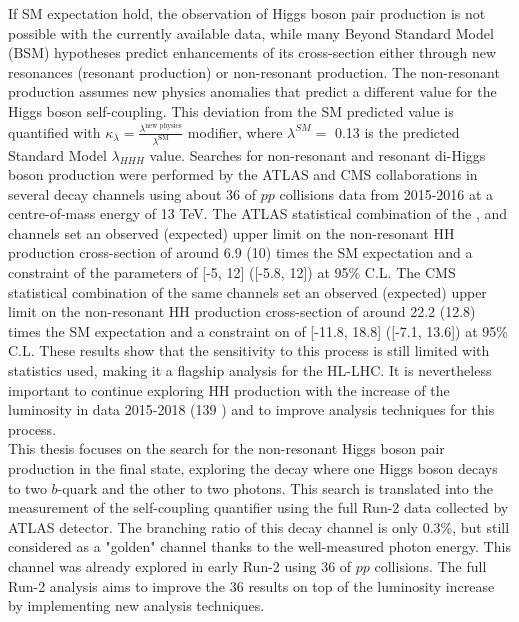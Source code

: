 If SM expectation hold, the observation of Higgs boson pair production is not possible with the currently available data, while many Beyond Standard Model (BSM) hypotheses predict enhancements of its cross-section either through new resonances (resonant production) or non-resonant production. The non-resonant production assumes new physics anomalies that predict a different value for the Higgs boson self-coupling. This deviation from the SM predicted value is quantified with $\kappa_{\lambda} = \frac{\lambda^{\text{new physics}}}{\lambda^{\text{SM}}}$ modifier, where $\lambda^{SM} = $ 0.13 is the predicted Standard Model $\lambda_{HHH}$ value. Searches for non-resonant and resonant di-Higgs boson production were performed by the ATLAS and CMS collaborations in several decay channels using about 36 \ifb of $pp$ collisions data from 2015-2016 at a centre-of-mass energy of 13 TeV. The ATLAS statistical combination of the \bbbb, \bbtt and \bbyy channels set an observed (expected) upper limit on the non-resonant HH production cross-section of around 6.9 (10) times the SM expectation and a constraint of the \kl parameters of [-5, 12] ([-5.8, 12]) at 95\% C.L. The CMS statistical combination of the same channels set an observed (expected) upper limit on the non-resonant HH production cross-section of around 22.2 (12.8) times the SM expectation and a constraint on \kl of [-11.8, 18.8] ([-7.1, 13.6]) at 95\% C.L. These results show that the sensitivity to this process is still limited with statistics used, making it a flagship analysis for the HL-LHC. It is nevertheless important to continue exploring HH production with the increase of the luminosity in data 2015-2018 (139 \ifb) and to improve analysis techniques for this process. \\
This thesis focuses on the search for the non-resonant Higgs boson pair production in the \bbyy final state, exploring the decay where one Higgs boson decays to two $b$-quark and the other to two photons. This search is translated into the measurement of the self-coupling quantifier \kl using the full Run-2 data collected by ATLAS detector. The branching ratio of this decay channel is only 0.3\%, but still considered as a "golden" channel thanks to the well-measured photon energy. This channel was already explored in early Run-2 using 36 \ifb of $pp$ collisions. The full Run-2 analysis aims to improve the 36 \ifb results on top of the luminosity increase by implementing new analysis techniques.\\
